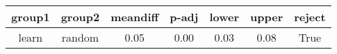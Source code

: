 \begin{tabular}{|c|c|c|c|c|c|c|}
\toprule
group1 &  group2 &  meandiff &  p-adj &  lower &  upper &  reject \\
\midrule
 learn &  random &      0.05 &   0.00 &   0.03 &   0.08 &    True \\
\bottomrule
\end{tabular}
